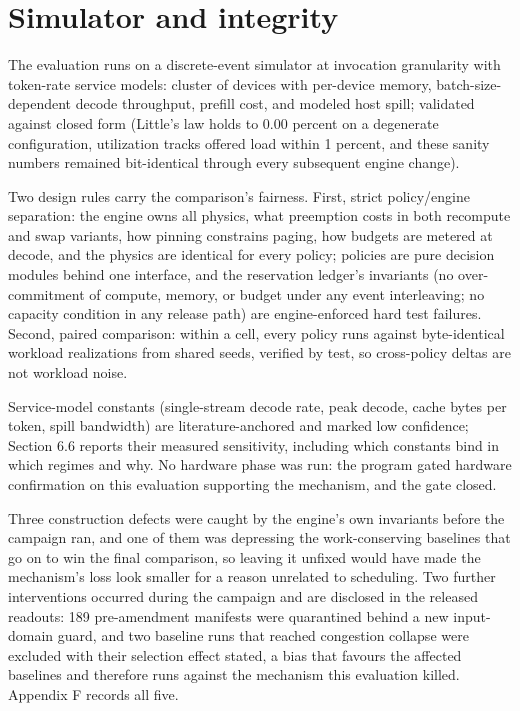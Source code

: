 \section{Simulator and integrity}

The evaluation runs on a discrete-event simulator at invocation granularity
with token-rate service models: cluster of devices with per-device memory,
batch-size-dependent decode throughput, prefill cost, and modeled host
spill; validated against closed form (Little's law holds to 0.00 percent on
a degenerate configuration, utilization tracks offered load within 1
percent, and these sanity numbers remained bit-identical through every
subsequent engine change).

Two design rules carry the comparison's fairness. First, strict
policy/engine separation: the engine owns all physics, what preemption
costs in both recompute and swap variants, how pinning constrains paging,
how budgets are metered at decode, and the physics are identical for every
policy; policies are pure decision modules behind one interface, and the
reservation ledger's invariants (no over-commitment of compute, memory, or
budget under any event interleaving; no capacity condition in any release
path) are engine-enforced hard test failures. Second, paired comparison:
within a cell, every policy runs against byte-identical workload
realizations from shared seeds, verified by test, so cross-policy deltas
are not workload noise.

Service-model constants (single-stream decode rate, peak decode, cache
bytes per token, spill bandwidth) are literature-anchored and marked low
confidence; Section 6.6 reports their measured sensitivity, including which
constants bind in which regimes and why. No hardware phase was run: the
program gated hardware confirmation on this evaluation supporting the
mechanism, and the gate closed.

Three construction defects were caught by the engine's own invariants
before the campaign ran, and one of them was depressing the
work-conserving baselines that go on to win the final comparison, so
leaving it unfixed would have made the mechanism's loss look smaller for
a reason unrelated to scheduling. Two further interventions occurred
during the campaign and are disclosed in the released readouts: 189
pre-amendment manifests were quarantined behind a new input-domain guard,
and two baseline runs that reached congestion collapse were excluded with
their selection effect stated, a bias that favours the affected baselines
and therefore runs against the mechanism this evaluation killed. Appendix
F records all five.
